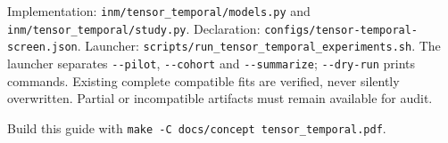 \documentclass[11pt,a4paper]{article}
\newcommand{\code}[1]{{\small\nolinkurl{#1}}}
\begin{document}
Implementation: \code{inm/tensor_temporal/models.py} and
\code{inm/tensor_temporal/study.py}. Declaration:
\code{configs/tensor-temporal-screen.json}. Launcher:
\code{scripts/run_tensor_temporal_experiments.sh}. The launcher separates
\code{--pilot}, \code{--cohort} and \code{--summarize}; \code{--dry-run} prints
commands. Existing complete compatible fits are verified, never silently
overwritten. Partial or incompatible artifacts must remain available for audit.

Build this guide with \verb|make -C docs/concept tensor_temporal.pdf|.
\end{document}
